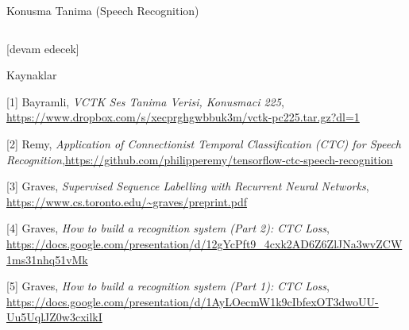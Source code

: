\documentclass[12pt,fleqn]{article}\usepackage{../../common}
\begin{document}
Konusma Tanima (Speech Recognition)

\inputminted[fontsize=\footnotesize]{python}{train.py}

[devam edecek]

Kaynaklar

[1] Bayramli, {\em VCTK Ses Tanima Verisi, Konusmaci 225}, \url{https://www.dropbox.com/s/xecprghgwbbuk3m/vctk-pc225.tar.gz?dl=1}

[2] Remy, {\em Application of Connectionist Temporal Classification (CTC) for Speech Recognition},\url{https://github.com/philipperemy/tensorflow-ctc-speech-recognition}

[3] Graves, {\em Supervised Sequence Labelling with Recurrent Neural Networks}, \url{https://www.cs.toronto.edu/~graves/preprint.pdf}

[4] Graves, {\em How to build a recognition system (Part 2): CTC Loss}, \url{https://docs.google.com/presentation/d/12gYcPft9_4cxk2AD6Z6ZlJNa3wvZCW1ms31nhq51vMk}

[5] Graves, {\em How to build a recognition system (Part 1): CTC Loss}, \url{https://docs.google.com/presentation/d/1AyLOecmW1k9cIbfexOT3dwoUU-Uu5UqlJZ0w3cxilkI}
\end{document}
